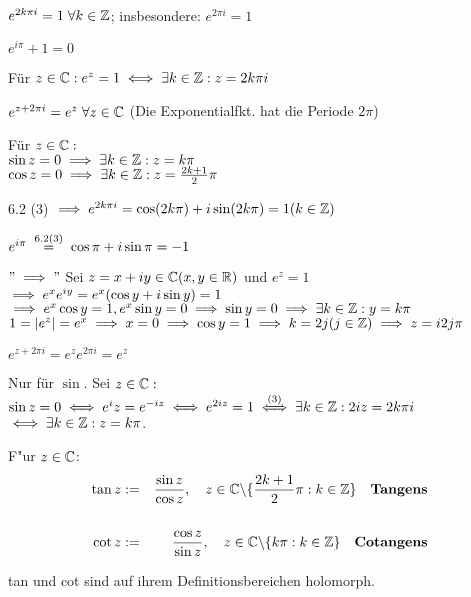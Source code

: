 \documentclass[a4paper,twoside,DIV15,BCOR12mm]{scrbook}
\def\gdw{\equizu}
\def\gdw{\equizu}
\begin{document}
\begin{folgerung}
\begin{liste}
\item $e^{2k\pi i} = 1 \; \forall k \in \mathbb{Z}$; insbesondere: $e^{2\pi i} = 1$
\item $e^{i\pi} + 1 = 0$
\item Für $z \in \MdC : e^z = 1 \gdw \exists k\in \MdZ : z = 2k\pi i$
\item $e^{z + 2\pi i} = e^z \;\forall z\in \mathbb{C}$ (Die Exponentialfkt. hat die Periode $2\pi$)
\item Für $z \in \mathbb{C} :$\\ 
$\sin z = 0 \implies\exists k \in \mathbb{Z} : z = k\pi$\\
$\cos z = 0 \implies\exists k \in \mathbb{Z} : z = \frac{2k+1}{2}\pi$
\end{liste}
\end{folgerung}

\begin{beweis}
\begin{liste}
\item 6.2 (3) $\implies e^{2k\pi i} = \cos (2k\pi) + i\sin (2k\pi) = 1 (k \in \mathbb{Z})$
\item $e^{i\pi} \gleichnach{6.2(3)} \cos\pi + i\sin\pi = -1$
\item $"\implies "$ Sei $z = x + iy \in \mathbb{C} (x,y \in \mathbb{R} )$ und $e^z = 1$ \\
$\implies e^xe^{iy} = e^x(\cos y +i\sin y) = 1$ \\
$\implies e^x\cos y = 1, e^x\sin y = 0 \implies \sin y = 0 \implies \exists k \in \mathbb{Z} : y = k\pi$\\
$ 1 = |e^z| = e^x \implies x=0 \implies \cos y = 1 \implies k=2j (j\in \mathbb{Z}) \implies z = i2j\pi$
\item $e^{z+2\pi i} = e^ze^{2\pi i} = e^z$
\item Nur für $\sin$. Sei $z \in \mathbb{C} :$ \\
$\sin z = 0 \gdw e^iz = e^{-iz} \gdw e^{2iz} = 1 \stackrel{(3)}{\gdw} \exists k \in \MdZ : 2iz = 2k\pi i$\\
$\gdw \exists k \in \MdZ : z = k\pi$.
\end{liste}
\end{beweis}


\begin{definition}
F"ur $z \in \mathbb{C}$:
\begin{eqnarray} 
\notag \tan z &:=& \frac{\sin z}{\cos z}, \quad z \in \MdC \backslash \{ \frac{2k+1}{2}\pi: k\in \MdZ \} \quad \begriff{Tangens}\\
\notag \\
\notag \cot z &:=& \frac{\cos z}{\sin z}, \quad z \in \MdC \backslash \{ k\pi: k\in \MdZ \}\quad \begriff{Cotangens}
\end{eqnarray}
\end{definition}
tan und cot sind auf ihrem Definitionsbereichen holomorph.
\end{document}
